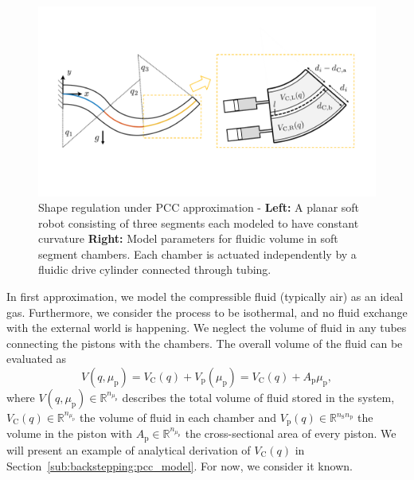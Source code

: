 \begin{figure}[ht]
  \centering
  \includegraphics[width=0.9\columnwidth]{backstepping/figures/backstepping_graphics_pcc_case_overview_v4_cropped.pdf}
  \caption{Shape regulation under \gls{PCC} approximation - \textbf{Left:} A planar soft robot consisting of three segments each modeled to have constant curvature \textbf{Right:} Model parameters for fluidic volume in soft segment chambers. Each chamber is actuated independently by a fluidic drive cylinder connected through tubing.}\label{fig:backstepping:pcc_case_overview}
\end{figure}


In first approximation, we model the compressible fluid (typically air) as an ideal gas. Furthermore, we consider the process to be isothermal, and no fluid exchange with the external world is happening. We neglect the volume of fluid in any tubes connecting the pistons with the chambers.
%
The overall volume of the fluid can be evaluated as %
%
\begin{equation}
V(q,\mu_\mathrm{p}) = V_{\mathrm{C}}(q) + V_{\mathrm{p}}(\mu_{\mathrm{p}}) = V_{\mathrm{C}}(q) + A_{\mathrm{p}} \mu_{\mathrm{p}}, 
\end{equation}
%
where $V(q,\mu_\mathrm{p}) \in \mathbb{R}^{n_{\mu_\mathrm{p}}}$ describes the total volume of fluid stored in the system, $V_{\mathrm{C}}(q) \in \mathbb{R}^{n_{\mu_\mathrm{p}}}$ the volume of fluid in each chamber and $V_{\mathrm{p}}(q) \in \mathbb{R}^{n_{\mathrm{S}} n_{\mathrm{p}}}$ the volume in the piston with $A_{\mathrm{p}} \in \mathbb{R}^{n_{\mu_\mathrm{p}}}$ the cross-sectional area of every piston.
%
%
We will present an example of analytical derivation of $V_{\mathrm{C}}(q)$ in Section~\ref{sub:backstepping:pcc_model}.
For now, we consider it known.

